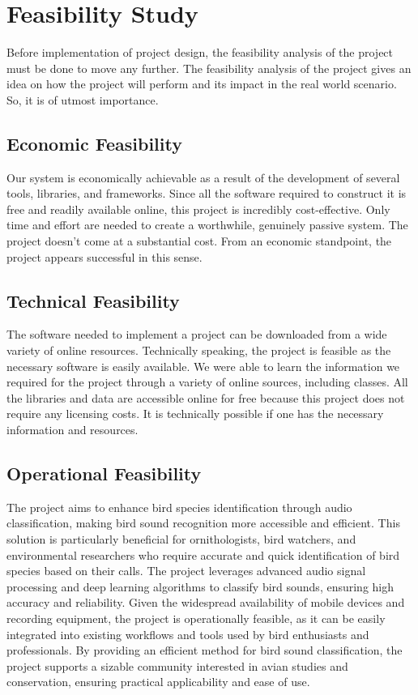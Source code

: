 \section{Feasibility Study}
Before implementation of project design, the feasibility analysis of the
project must be done to move any further. The feasibility analysis of the
project gives an idea on how the project will perform and its impact in the
real world scenario. So, it is of utmost importance.
\subsection{Economic Feasibility}
Our system is economically achievable as a result of the development of several
tools, libraries, and frameworks. Since all the software required to construct
it is free and readily available online, this project is incredibly
cost-effective. Only time and effort are needed to create a worthwhile,
genuinely passive system. The project doesn't come at a substantial cost. From
an economic standpoint, the project appears successful in this sense.

\subsection{Technical Feasibility}
The software needed to implement a project can be downloaded from a wide
variety of online resources. Technically speaking, the project is feasible as
the necessary software is easily available. We were able to learn the
information we required for the project through a variety of online sources,
including classes. All the libraries and data are accessible online for free
because this project does not require any licensing costs. It is technically
possible if one has the necessary information and resources.

\subsection{Operational Feasibility}
The project aims to enhance bird species identification through audio
classification, making bird sound recognition more accessible and efficient.
This solution is particularly beneficial for ornithologists, bird watchers, and
environmental researchers who require accurate and quick identification of bird
species based on their calls. The project leverages advanced audio signal
processing and deep learning algorithms to classify bird sounds, ensuring high
accuracy and reliability. Given the widespread availability of mobile devices
and recording equipment, the project is operationally feasible, as it can be
easily integrated into existing workflows and tools used by bird enthusiasts
and professionals. By providing an efficient method for bird sound
classification, the project supports a sizable community interested in avian
studies and conservation, ensuring practical applicability and ease of use.

